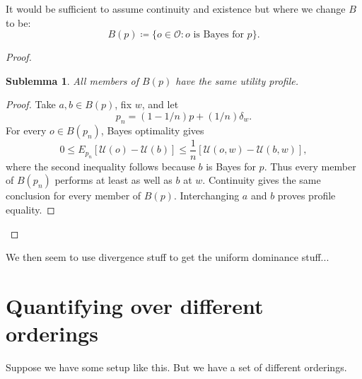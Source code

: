 \documentclass[11pt]{article}
\newtheorem{sublemma}{Sublemma}[theorem]
\theoremstyle{definition}
\theoremstyle{remark}
\newcommand{\U}{\mathcal U}
\newcommand{\supp}{\operatorname{supp}}
\begin{document}
It would  be sufficient to assume continuity and existence but where we change $B$ to be: 
\[
B(p)
\coloneqq
\{o\in\mathcal O:
o\text{ is Bayes for }p\}.
\]
\begin{proof}
	

\begin{sublemma}
	All members
	of $B(p)$ have the same utility profile.
\end{sublemma}
\begin{proof}Take $a,b\in B(p)$, fix $w$, and let
	\[
	p_n=(1-1/n)p+(1/n)\delta_w.
	\]
	For every $o\in B(p_n)$, Bayes optimality gives
	\[
	0\le E_{p_n}[\U(o)-\U(b)]
	\le \frac1n[\U(o,w)-\U(b,w)],
	\]
	where the second inequality follows because
	$b$ is Bayes for $p$.
	Thus every member of $B(p_n)$ performs at least
	as well as $b$ at $w$. Continuity gives the same
	conclusion for every member of $B(p)$.
	Interchanging $a$ and $b$ proves profile equality.
\end{proof}
\end{proof}
%	
%	
%	
%	

We then seem to use divergence stuff to get the uniform dominance stuff...



\section{Quantifying over different orderings}

Suppose we have some setup like this. But we have a set of different orderings. 
\end{document}

